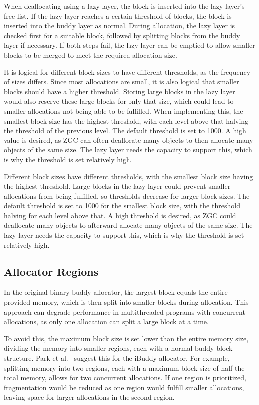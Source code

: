 When deallocating using a lazy layer, the block is inserted into the lazy layer's free-list. If the lazy layer reaches a certain threshold of blocks, the block is inserted into the buddy layer as normal. During allocation, the lazy layer is checked first for a suitable block, followed by splitting blocks from the buddy layer if necessary. If both steps fail, the lazy layer can be emptied to allow smaller blocks to be merged to meet the required allocation size.

It is logical for different block sizes to have different thresholds, as the frequency of sizes differs. Since most allocations are small, it is also logical that smaller blocks should have a higher threshold. Storing large blocks in the lazy layer would also reserve these large blocks for only that size, which could lead to smaller allocations not being able to be fulfilled. When implementing this, the smallest block size has the highest threshold, with each level above that halving the threshold of the previous level. The default threshold is set to 1000. A high value is desired, as ZGC can often deallocate many objects to then allocate many objects of the same size. The lazy layer needs the capacity to support this, which is why the threshold is set relatively high.

Different block sizes have different thresholds, with the smallest block size having the highest threshold. Large blocks in the lazy layer could prevent smaller allocations from being fulfilled, so thresholds decrease for larger block sizes. The default threshold is set to 1000 for the smallest block size, with the threshold halving for each level above that. A high threshold is desired, as ZGC could deallocate many objects to afterward allocate many objects of the same size. The lazy layer needs the capacity to support this, which is why the threshold is set relatively high.

\newpage
\subsection{Allocator Regions} \label{sec:concurrencyexpl}
In the original binary buddy allocator, the largest block equals the entire provided memory, which is then split into smaller blocks during allocation. This approach can degrade performance in multithreaded programs with concurrent allocations, as only one allocation can split a large block at a time.

To avoid this, the maximum block size is set lower than the entire memory size, dividing the memory into smaller regions, each with a normal buddy block structure. Park et al.~\cite{park2014ibuddy} suggest this for the iBuddy allocator. For example, splitting memory into two regions, each with a maximum block size of half the total memory, allows for two concurrent allocations. If one region is prioritized, fragmentation would be reduced as one region would fulfill smaller allocations, leaving space for larger allocations in the second region.

